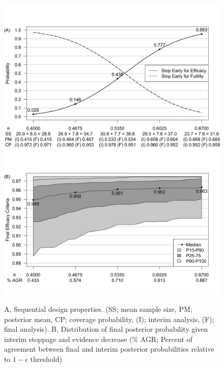 \documentclass[useAMS,usenatbib,referee]{biom}
\begin{document}
\begin{figure}\begin{center}

    \includegraphics[width=6in]{figure3a.png}
    \includegraphics[width=6in]{figure3b.png}
    \caption{A, Sequential design properties. (SS; mean sample size, PM; posterior mean, CP; coverage probability, (I); interim analysis, (F); final analysis). B, Distribution of final posterior probability given interim stoppage and evidence decrease ($\%$ AGR; Percent of agreement between final and interim posterior probabilities relative to $1-\epsilon$ threshold)}
	\label{fig:ex1.1}

\end{center}
\end{figure}
\end{document}
